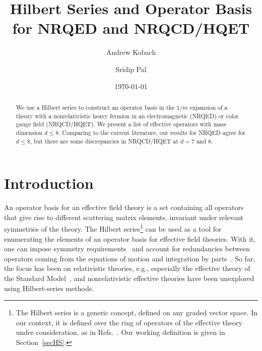 \documentclass[prd,onecolumn, nofootinbib, 11pt]{revtex4}
\begin{document}
\title{Hilbert Series and Operator Basis for NRQED and  NRQCD/HQET}
\author{Andrew Kobach}
\author{Sridip Pal}

\date{\today}


\begin{abstract}
We use a Hilbert series to construct an operator basis in the $1/m$ expansion of a theory with a nonrelativistic heavy fermion in an electromagnetic (NRQED) or color gauge field (NRQCD/HQET).  We present a list of effective operators with mass dimension $d\leq 8$.  Comparing to the current literature, our results for NRQED agree for $d\leq 8$, but there are some discrepancies in NRQCD/HQET at $d=7$ and 8. 
\end{abstract}

\maketitle


\linespread{1}


\section{Introduction}
 An operator basis for an effective field theory is a set containing all operators that give rise to different scattering matrix elements, invariant under relevant symmetries of the theory. The Hilbert series\footnote{The Hilbert series is a generic concept, defined on any graded vector space. In our context, it is defined over the ring of operators of the effective theory under consideration, as in Refs.~\cite{Henning:2015daa, Henning:2015alf}. Our working definition is given in Section~\ref{secHS}.} can be used as a tool for enumerating the elements of an operator basis for effective field theories. 
With it, one can impose symmetry requirements~\cite{Feng:2007ur, Jenkins:2009dy, Hanany:2010vu} and account for redundancies between operators coming from the equations of motion and integration by parts~\cite{Henning:2015daa, Henning:2015alf}.    
%
So far, the focus has been on relativistic theories, e.g., especially the effective theory of the Standard Model~\cite{Henning:2015alf, Lehman:2015via, Lehman:2015coa}, and nonrelativistic effective theories have been unexplored using Hilbert-series methods. 
\end{document}

